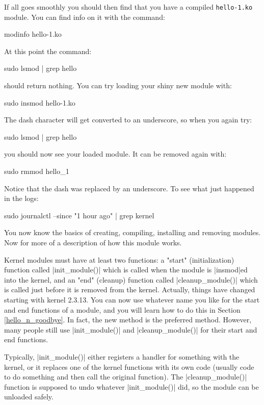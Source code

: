 \documentclass[10pt, oneside]{book}
\begin{document}
If all goes smoothly you should then find that you have a compiled \verb|hello-1.ko| module.
You can find info on it with the command:
\begin{codebash}
modinfo hello-1.ko
\end{codebash}

At this point the command:
\begin{codebash}
sudo lsmod | grep hello
\end{codebash}

should return nothing.
You can try loading your shiny new module with:
\begin{codebash}
sudo insmod hello-1.ko
\end{codebash}

The dash character will get converted to an underscore, so when you again try:
\begin{codebash}
sudo lsmod | grep hello
\end{codebash}

you should now see your loaded module. It can be removed again with:
\begin{codebash}
sudo rmmod hello_1
\end{codebash}

Notice that the dash was replaced by an underscore.
To see what just happened in the logs:
\begin{codebash}
sudo journalctl --since "1 hour ago" | grep kernel
\end{codebash}

You now know the basics of creating, compiling, installing and removing modules.
Now for more of a description of how this module works.

Kernel modules must have at least two functions: a "start" (initialization) function called \cpp|init_module()| which is called when the module is \sh|insmod|ed into the kernel, and an "end" (cleanup) function called \cpp|cleanup_module()| which is called just before it is removed from the kernel.
Actually, things have changed starting with kernel 2.3.13.
You can now use whatever name you like for the start and end functions of a module, and you will learn how to do this in Section \ref{hello_n_goodbye}.
In fact, the new method is the preferred method.
However, many people still use \cpp|init_module()| and \cpp|cleanup_module()| for their start and end functions.

Typically, \cpp|init_module()| either registers a handler for something with the kernel, or it replaces one of the kernel functions with its own code (usually code to do something and then call the original function).
The \cpp|cleanup_module()| function is supposed to undo whatever \cpp|init_module()| did, so the module can be unloaded safely.
\end{document}
